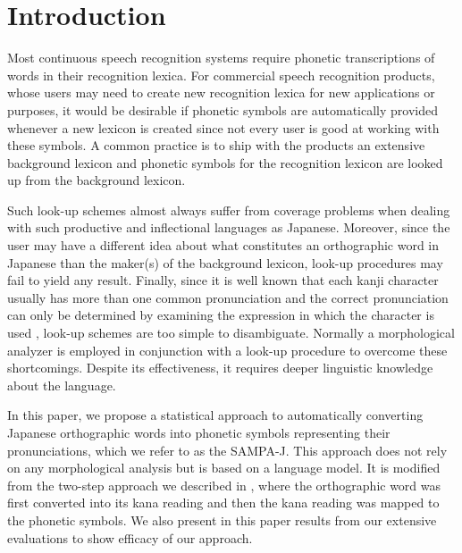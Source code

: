 



\maketitle

\thispagestyle{empty}


\section{Introduction}
\label{intro}

Most continuous speech recognition systems require phonetic
transcriptions of words in their recognition lexica. For
commercial speech recognition products, whose users may need to
create new recognition lexica for new applications or purposes, it
would be desirable if phonetic symbols are automatically provided
whenever a new lexicon is created since not every user is good at
working with these symbols. A common practice is to ship with the
products an extensive background lexicon and phonetic symbols for
the recognition lexicon are looked up from the background lexicon.

Such look-up schemes almost always suffer from coverage problems
when dealing with such productive and inflectional languages as
Japanese. Moreover, since the user may have a different idea about
what constitutes an orthographic word in Japanese than the
maker(s) of the background lexicon, look-up procedures may fail to
yield any result. Finally, since it is well known that each kanji
character usually has more than one common pronunciation and the
correct pronunciation can only be determined by examining the
expression in which the character is used \cite[p.~130]{Shibatani},
look-up schemes are too simple to disambiguate. Normally a
morphological analyzer is employed in conjunction with a look-up
procedure to overcome these shortcomings. Despite its effectiveness,
it requires deeper linguistic knowledge about the language.

In this paper, we propose a statistical approach to automatically
converting Japanese orthographic words into phonetic symbols
representing their pronunciations, which we refer to as the
SAMPA-J. This approach does not rely on any morphological analysis
but is based on a language model. It is modified from the two-step
approach we described in \cite{Chang}, where the orthographic word
was first converted into its kana reading and then the kana
reading was mapped to the phonetic symbols. We also present in
this paper results from our extensive evaluations to show efficacy
of our approach.

